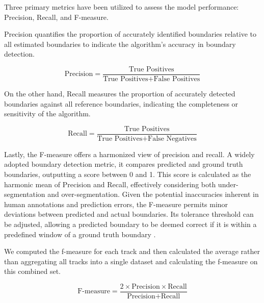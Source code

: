Three primary metrics have been utilized to assess the model performance: Precision, Recall, and F-measure. 

Precision quantifies the proportion of accurately identified boundaries relative to all estimated boundaries to indicate the algorithm's accuracy in boundary detection.

\begin{equation}
\text{Precision} = \frac{\text{True Positives}}{\text{True Positives} + \text{False Positives}}
\end{equation}

On the other hand, Recall measures the proportion of accurately detected boundaries against all reference boundaries, indicating the completeness or sensitivity of the algorithm.

\begin{equation}
\text{Recall} = \frac{\text{True Positives}}{\text{True Positives} + \text{False Negatives}}
\end{equation}

Lastly, the F-measure offers a harmonized view of precision and recall. A widely adopted boundary detection metric, it compares predicted and ground truth boundaries, outputting a score between 0 and 1. This score is calculated as the harmonic mean of Precision and Recall, effectively considering both under-segmentation and over-segmentation. Given the potential inaccuracies inherent in human annotations and prediction errors, the F-measure permits minor deviations between predicted and actual boundaries. Its tolerance threshold can be adjusted, allowing a predicted boundary to be deemed correct if it is within a predefined window of a ground truth boundary \cite{NietoPerceptualMusic, Turnbull2007ABOOSTING}.

We computed the f-measure for each track and then calculated the average rather than aggregating all tracks into a single dataset and calculating the f-measure on this combined set.

\begin{equation}
\text{F-measure} = \frac{2 \times \text{Precision} \times \text{Recall}}{\text{Precision} + \text{Recall}}
\end{equation}

\newpage